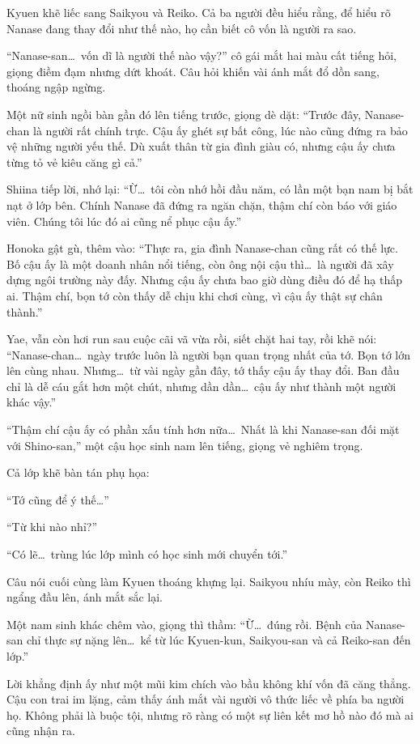 \documentclass[../main.tex]{subfiles}
\begin{document}
Kyuen khẽ liếc sang Saikyou và Reiko. Cả ba người đều hiểu rằng, để hiểu rõ Nanase đang thay đổi như thế nào, họ cần biết cô vốn là người ra sao.

``Nanase-san\dots\ vốn dĩ là người thế nào vậy?'' cô gái mắt hai màu cất tiếng hỏi, giọng điềm đạm nhưng dứt khoát. Câu hỏi khiến vài ánh mắt đổ dồn sang, thoáng ngập ngừng.

Một nữ sinh ngồi bàn gần đó lên tiếng trước, giọng dè dặt: ``Trước đây, Nanase-chan là người rất chính trực. Cậu ấy ghét sự bất công, lúc nào cũng đứng ra bảo vệ những người yếu thế. Dù xuất thân từ gia đình giàu có, nhưng cậu ấy chưa từng tỏ vẻ kiêu căng gì cả.''

Shiina tiếp lời, nhớ lại: ``Ừ\dots\ tôi còn nhớ hồi đầu năm, có lần một bạn nam bị bắt nạt ở lớp bên. Chính Nanase đã đứng ra ngăn chặn, thậm chí còn báo với giáo viên. Chúng tôi lúc đó ai cũng nể phục cậu ấy.''

Honoka gật gù, thêm vào: ``Thực ra, gia đình Nanase-chan cũng rất có thế lực. Bố cậu ấy là một doanh nhân nổi tiếng, còn ông nội cậu thì\dots\ là người đã xây dựng ngôi trường này đấy. Nhưng cậu ấy chưa bao giờ dùng điều đó để hạ thấp ai. Thậm chí, bọn tớ còn thấy dễ chịu khi chơi cùng, vì cậu ấy thật sự chân thành.''

Yae, vẫn còn hơi run sau cuộc cãi vã vừa rồi, siết chặt hai tay, rồi khẽ nói: ``Nanase-chan\dots\ ngày trước luôn là người bạn quan trọng nhất của tớ. Bọn tớ lớn lên cùng nhau. Nhưng\dots\ từ vài ngày gần đây, tớ thấy cậu ấy thay đổi. Ban đầu chỉ là dễ cáu gắt hơn một chút, nhưng dần dần\dots\ cậu ấy như thành một người khác vậy.''

``Thậm chí cậu ấy có phần xấu tính hơn nữa\dots\ Nhất là khi Nanase-san đối mặt với Shino-san,'' một cậu học sinh nam lên tiếng, giọng vẻ nghiêm trọng.

Cả lớp khẽ bàn tán phụ họa:

``Tớ cũng để ý thế\dots''

``Từ khi nào nhỉ?''

``Có lẽ\dots\ trùng lúc lớp mình có học sinh mới chuyển tới.''

Câu nói cuối cùng làm Kyuen thoáng khựng lại. Saikyou nhíu mày, còn Reiko thì ngẩng đầu lên, ánh mắt sắc lại.

Một nam sinh khác chêm vào, giọng thì thầm: ``Ừ\dots\ đúng rồi. Bệnh của Nanase-san chỉ thực sự nặng lên\dots\ kể từ lúc Kyuen-kun, Saikyou-san và cả Reiko-san đến lớp.''

Lời khẳng định ấy như một mũi kim chích vào bầu không khí vốn đã căng thẳng. Cậu con trai im lặng, cảm thấy ánh mắt vài người vô thức liếc về phía ba người họ. Không phải là buộc tội, nhưng rõ ràng có một sự liên kết mơ hồ nào đó mà ai cũng nhận ra.
\end{document}
